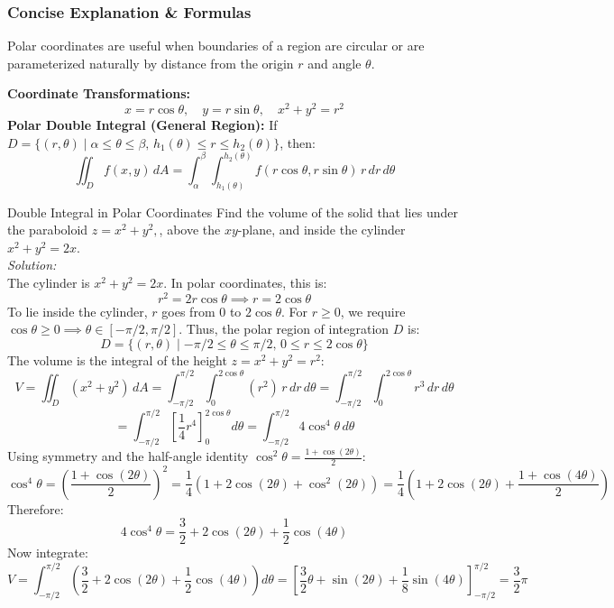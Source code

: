 \documentclass[11pt]{article}
\begin{document}
\subsubsection*{Concise Explanation \& Formulas}
Polar coordinates are useful when boundaries of a region are circular or are parameterized naturally by distance from the origin $r$ and angle $\theta$.
\begin{formulabox}
    \textbf{Coordinate Transformations:}
    \[ x = r\cos\theta, \quad y = r\sin\theta, \quad x^2 + y^2 = r^2 \]
    \textbf{Polar Double Integral (General Region):}
    If $D = \{(r,\theta) \mid \alpha \le \theta \le \beta, \, h_1(\theta) \le r \le h_2(\theta)\}$, then:
    \[ \iint_D f(x,y)\,dA = \int_\alpha^\beta \int_{h_1(\theta)}^{h_2(\theta)} f(r\cos\theta, r\sin\theta) \, r\,dr\,d\theta \]
\end{formulabox}

\begin{examplebox}{Double Integral in Polar Coordinates}
    Find the volume of the solid that lies under the paraboloid $z = x^2 + y^2,$, above the $xy$-plane, and inside the cylinder $x^2 + y^2 = 2x$.\\
    \textit{Solution:}\\
    The cylinder is $x^2 + y^2 = 2x$. In polar coordinates, this is:
    \[ r^2 = 2r\cos\theta \implies r = 2\cos\theta \]
    To lie inside the cylinder, $r$ goes from $0$ to $2\cos\theta$. For $r \ge 0$, we require $\cos\theta \ge 0 \implies \theta \in [-\pi/2, \pi/2]$. Thus, the polar region of integration $D$ is:
    \[ D = \{(r,\theta) \mid -\pi/2 \le \theta \le \pi/2, \, 0 \le r \le 2\cos\theta\} \]
    The volume is the integral of the height $z = x^2 + y^2 = r^2$:
    \[ V = \iint_D (x^2+y^2)\,dA = \int
_{-\pi/2}^{\pi/2} \int_0^{2\cos\theta} (r^2) \, r\,dr\,d\theta = \int_{-\pi/2}^{\pi/2} \int_0^{2\cos\theta} r^3 \,dr\,d\theta \]
    \[ = \int_{-\pi/2}^{\pi/2} \left[ \frac{1}{4}r^4 \right]_0^{2\cos\theta} d\theta = \int_{-\pi/2}^{\pi/2} 4\cos^4\theta\,d\theta \]
    Using symmetry and the half-angle identity $\cos^2\theta = \frac{1+\cos(2\theta)}{2}$:
    \[ \cos^4\theta = \left(\frac{1+\cos(2\theta)}{2}\right)^2 = \frac{1}{4}(1 + 2\cos(2\theta) + \cos^2(2\theta)) = \frac{1}{4}\left(1 + 2\cos(2\theta) + \frac{1+\cos(4\theta)}{2}\right) \]
    Therefore:
    \[ 4\cos^4\theta = \frac{3}{2} + 2\cos(2\theta) + \frac{1}{2}\cos(4\theta) \]
    Now integrate:
    \[ V = \int_{-\pi/2}^{\pi/2} \left( \frac{3}{2} + 2\cos(2\theta) + \frac{1}{2}\cos(4\theta) \right) d\theta = \left[ \frac{3}{2}\theta + \sin(2\theta) + \frac{1}{8}\sin(4\theta) \right]_{-\pi/2}^{\pi/2} = \frac{3}{2}\pi \]
\end{examplebox}
\end{document}
